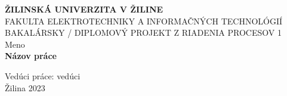 \thispagestyle{empty} %

\begin{center} %
	\begin{Large}
		\textbf{ŽILINSKÁ UNIVERZITA V ŽILINE} \\
		\vspace{0.5cm}
		FAKULTA ELEKTROTECHNIKY
		A INFORMAČNÝCH TECHNOLÓGIÍ \\
		\vspace{5cm}
		BAKALÁRSKY / DIPLOMOVÝ PROJEKT
		Z RIADENIA PROCESOV 1\\
		\vspace{5cm}
		Meno \\
		\vspace{.5cm}
		\textbf{Názov práce} \\
		\vfill
	\end{Large}

	Vedúci práce: vedúci \\
	Žilina 2023 \\
\end{center}